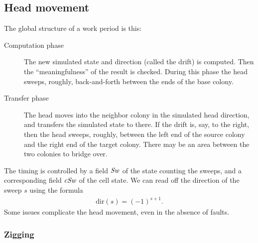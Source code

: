 \documentclass[12pt]{memoir}
\newcommand{\fld}[1]{\ensuremath{\textit{#1\/}}}
\newcommand{\Sweep}{\fld{Sw}}
\newcommand{\cSweep}{\fld{cSw}}
\newcommand{\dir}{\mathrm{dir}}
\begin{document}
\subsection{Head movement}\label{sec:sweep}

The global structure of a work period is this:
\begin{description}

\item[Computation phase] 
The new simulated state and direction (called the drift) is computed.
Then the ``meaningfulness'' of the result is checked.
During this phase the head sweeps, roughly, back-and-forth between
the ends of the base colony.

\item[Transfer phase]
The head moves into the neighbor colony in the simulated head direction,
and transfers the simulated state to there.
If the drift is, say, to the right, then the head sweeps, roughly, between the 
left end of the source colony and the right end of the target colony.
There may be an area between the  two colonies to bridge over.
\end{description}

The timing is controlled by a field \( \Sweep \) of the state counting the sweeps,
and a corresponding field \( \cSweep \)  of the cell state.
We can read off the direction of the sweep \( s \) using the formula
     \begin{align}\label{eq:sweep-dir}
       \dir(s)=(-1)^{s + 1}.
     \end{align}
Some issues complicate the head movement, even in the absence of faults.

\subsubsection{Zigging}\label{sec:zigging}
\end{document}
